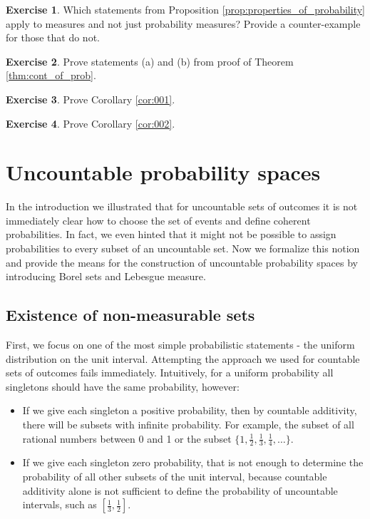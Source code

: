 \documentclass{book}
\theoremstyle{plain}%
\theoremstyle{definition}
\newtheorem{exercise}{Exercise}[chapter]
\begin{document}
\begin{exercise}
Which statements from Proposition \ref{prop:properties_of_probability} apply to measures and not just probability measures? Provide a counter-example for those that do not.
\end{exercise}

\begin{exercise}
Prove statements (a) and (b) from proof of Theorem \ref{thm:cont_of_prob}.
\end{exercise}

\begin{exercise}
Prove Corollary \ref{cor:001}.
\end{exercise}

\begin{exercise}
Prove Corollary \ref{cor:002}.
\end{exercise}


\chapter{Uncountable probability spaces}

In the introduction we illustrated that for uncountable sets of outcomes it is not immediately clear how to choose the set of events and define coherent probabilities. In fact, we even hinted that it might not be possible to assign probabilities to every subset of an uncountable set. Now we formalize this notion and provide the means for the construction of uncountable probability spaces by introducing Borel sets and Lebesgue measure.

\section{Existence of non-measurable sets}

First, we focus on one of the most simple probabilistic statements - the uniform distribution on the unit interval. Attempting the approach we used for countable sets of outcomes fails immediately. Intuitively, for a uniform probability all singletons should have the same probability, however:

\begin{itemize}
\item If we give each singleton a positive probability, then by countable additivity, there will be subsets with infinite probability. For example, the subset of all rational numbers between 0 and 1 or the subset $\{1, \frac{1}{2}, \frac{1}{3}, \frac{1}{4}, \dots\}$.
\item  If we give each singleton zero probability, that is not enough to determine the probability of all other subsets of the unit interval, because countable additivity alone is not sufficient to define the probability of uncountable intervals, such as $[\frac{1}{3}, \frac{1}{2}]$.
\end{itemize}
\end{document}
